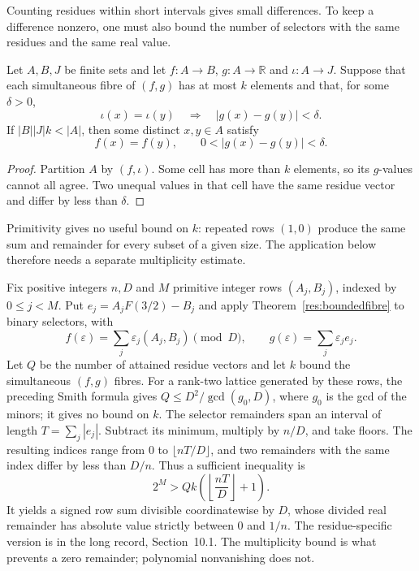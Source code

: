 \documentclass[11pt]{article}
\begin{document}
Counting residues within short intervals gives small differences.
To keep a difference nonzero, one must also bound the number of selectors
with the same residues and the same real value.

\begin{theorem}\label{res:boundedfibre}
Let $A,B,J$ be finite sets and let $f:A\to B$, $g:A\to\mathbb R$ and
$\iota:A\to J$.  Suppose that each simultaneous fibre of $(f,g)$ has at
most $k$ elements and that, for some $\delta>0$,
\[
 \iota(x)=\iota(y)\quad\Longrightarrow\quad |g(x)-g(y)|<\delta.
\]
If $|B||J|k<|A|$, then some distinct $x,y\in A$ satisfy
\[
 f(x)=f(y),\qquad 0<|g(x)-g(y)|<\delta.
\]
\end{theorem}
\begin{proof}
Partition $A$ by $(f,\iota)$.  Some cell has more than $k$ elements, so its
$g$-values cannot all agree.  Two unequal values in that cell have the same
residue vector and differ by less than $\delta$.
\end{proof}

Primitivity gives no useful bound on $k$: repeated rows $(1,0)$
produce the same sum and remainder for every subset of a given size.
The application below therefore needs a separate multiplicity estimate.

Fix positive integers $n,D$ and $M$ primitive integer rows
$(A_j,B_j)$, indexed by $0\le j<M$. Put $e_j=A_jF(3/2)-B_j$ and
apply Theorem~\ref{res:boundedfibre} to binary selectors, with
\[
 f(\varepsilon)=\sum_j\varepsilon_j(A_j,B_j)\pmod D,
 \qquad g(\varepsilon)=\sum_j\varepsilon_j e_j.
\]
Let $Q$ be the number of attained residue vectors and let $k$ bound the
simultaneous $(f,g)$ fibres.
For a rank-two lattice generated by these rows, the preceding Smith
formula gives $Q\le D^2/\gcd(g_0,D)$, where $g_0$ is the gcd of the
minors; it gives no bound on $k$.
The selector remainders span an interval of length $T=\sum_j|e_j|$.
Subtract its minimum, multiply by $n/D$, and take floors. The resulting
indices range from $0$ to $\lfloor nT/D\rfloor$, and two remainders
with the same index differ by less than $D/n$. Thus a sufficient inequality is
\begin{equation}\label{eq:quantitative-selector-budget}
 2^M>Qk\left(\left\lfloor\frac{nT}{D}\right\rfloor+1\right).
\end{equation}
It yields a signed row sum divisible coordinatewise by $D$, whose
divided real remainder has absolute value strictly between $0$ and $1/n$.
The residue-specific version is in the long record, Section~10.1. The multiplicity bound
is what prevents a zero remainder; polynomial nonvanishing does not.
\end{document}
